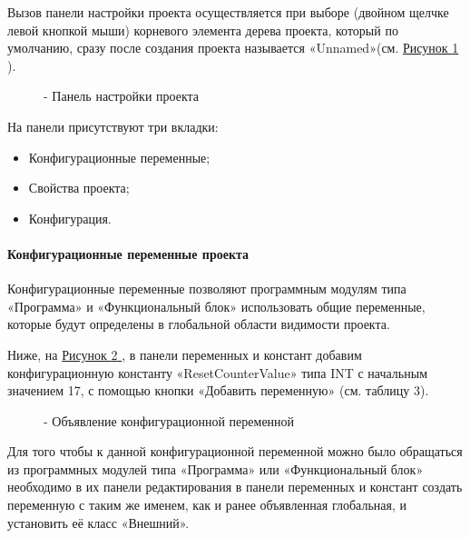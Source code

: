 \documentclass[letterpaper,10pt,russian]{sphinxmanual}
\begin{document}
Вызов панели настройки проекта осуществляется при выборе (двойном щелчке
левой кнопкой мыши) корневого элемента дерева проекта, который по
умолчанию, сразу после создания проекта называется «Unnamed»(см. \hyperref[usage_guide/work_with_project:image147]{Рисунок \ref{usage_guide/work_with_project:image147} }).
\begin{figure}[htbp]
\centering
\capstart

\noindent{}
\caption{- Панель настройки проекта}\label{usage_guide/work_with_project:image147}\end{figure}

На панели присутствуют три вкладки:
\begin{itemize}
\item {} 
Конфигурационные переменные;

\item {} 
Свойства проекта;

\item {} 
Конфигурация.

\end{itemize}


\paragraph{Конфигурационные переменные проекта}
\label{usage_guide/work_with_project:id4}
Конфигурационные переменные позволяют программным модулям типа
«Программа» и «Функциональный блок» использовать общие переменные,
которые будут определены в глобальной области видимости проекта.

Ниже, на \hyperref[usage_guide/work_with_project:image149]{Рисунок \ref{usage_guide/work_with_project:image149} }, в панели переменных и констант добавим
конфигурационную константу «ResetCounterValue» типа INT с начальным
значением 17, с помощью кнопки «Добавить переменную» (см. таблицу 3).
\begin{figure}[htbp]
\centering
\capstart

\noindent{}
\caption{- Объявление конфигурационной переменной}\label{usage_guide/work_with_project:image149}\end{figure}

Для того чтобы к данной конфигурационной переменной можно было
обращаться из программных модулей типа «Программа» или «Функциональный
блок» необходимо в их панели редактирования в панели переменных и
констант создать переменную с таким же именем, как и ранее объявленная
глобальная, и установить её класс «Внешний».
\end{document}
